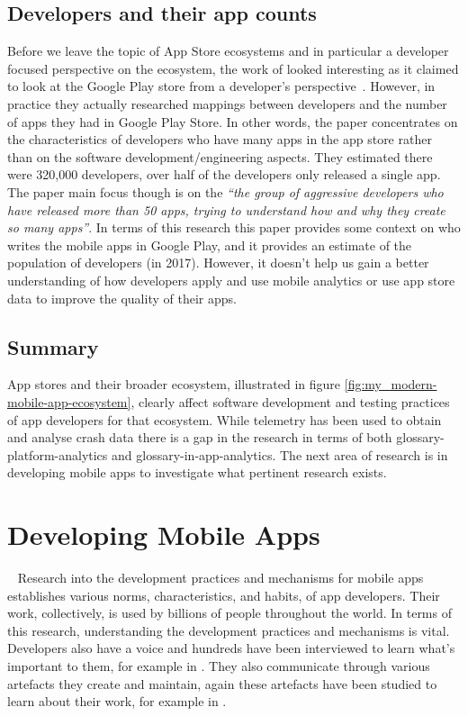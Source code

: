 \subsection{Developers and their app counts}
Before we leave the topic of App Store ecosystems and in particular a developer focused perspective on the ecosystem, the work of \citeauthor{wang2017_exploratory_study_of_the_mobile_app_ecosystem} looked interesting as it claimed to look at the Google Play store from a developer's perspective~. However, in practice they actually researched mappings between developers and the number of apps they had in Google Play Store. In other words, the paper concentrates on the characteristics of developers who have many apps in the app store rather than on the software development/engineering aspects. They estimated there were 320,000 developers, over half of the developers only released a single app. The paper main focus though is on the \emph{``the group of aggressive developers who have released more than 50 apps, trying to understand how and why they create so many apps''}. In terms of this research this paper provides some context on who writes the mobile apps in Google Play, and it provides an estimate of the population of developers (in 2017). However, it doesn't help us gain a better understanding of how developers apply and use mobile analytics or use app store data to improve the quality of their apps.

\subsection{Summary} %
App stores and their broader ecosystem, illustrated in figure \ref{fig:my_modern-mobile-app-ecosystem}, clearly affect software development and testing practices of app developers for that ecosystem. While telemetry has been used to obtain and analyse crash data there is a gap in the research in terms of both \gls{glossary-platform-analytics} and \gls{glossary-in-app-analytics}. The next area of research is in developing mobile apps to investigate what pertinent research exists.


\section{Developing Mobile Apps}~\label{rw-developing-mobile-apps-section}
Research into the development practices and mechanisms for mobile apps establishes various norms, characteristics, and habits, of app developers. Their work, collectively, is used by billions of people throughout the world. In terms of this research, understanding the development practices and mechanisms is vital. Developers also have a voice and hundreds have been interviewed to learn what's important to them, for example in . They also communicate through various artefacts they create and maintain, again these artefacts have been studied to learn about their work, for example in .

